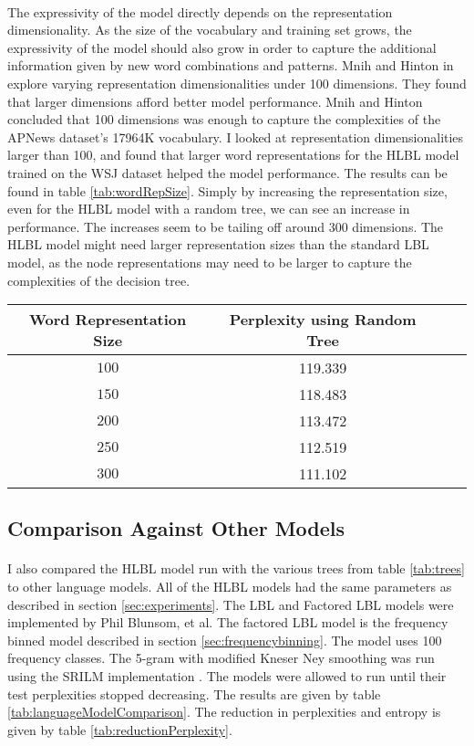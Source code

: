 \paragraph{}
The expressivity of the model directly depends on the representation dimensionality. As the size of the vocabulary and training set grows, the expressivity of the model should also grow in order to capture the additional information given by new word combinations and patterns. Mnih and Hinton in \cite{MnihHinton2009} explore varying representation dimensionalities under 100 dimensions. They found that larger dimensions afford better model performance. Mnih and Hinton concluded that 100 dimensions was enough to capture the complexities of the APNews dataset's 17964K vocabulary. I looked at representation dimensionalities larger than 100, and found that larger word representations for the HLBL model trained on the WSJ dataset helped the model performance. The results can be found in table \ref{tab:wordRepSize}. Simply by increasing the representation size, even for the HLBL model with a random tree, we can see an increase in performance. The increases seem to be tailing off around 300 dimensions.  The HLBL model might need larger representation sizes than the standard LBL model, as the node representations may need to be larger to capture the complexities of the decision tree.


\begin{table*} \centering
{}
\begin{tabular}{@{}cccc@{}}\toprule
Word Representation Size & Perplexity using Random Tree\\ 
\midrule
$100$ & 119.339 \\
$150$ & 118.483 \\
$200$ & 113.472 \\
$250$ & 112.519 \\
$300$ & 111.102 \\
\bottomrule
\end{tabular}
\caption{The effect of word representation size on test perplexity.}
\label{tab:wordRepSize}
\end{table*}

\subsection{Comparison Against Other Models}
\paragraph{}
I also compared the HLBL model run with the various trees from table \ref{tab:trees} to other language models. All of the HLBL models had the same parameters as described in section \ref{sec:experiments}. The LBL and Factored LBL models were implemented by Phil Blunsom, et al. The factored LBL model is the frequency binned model described in section \ref{sec:frequencybinning}. The model uses 100 frequency classes. The 5-gram with modified Kneser Ney smoothing was run using the SRILM implementation \cite{Alumae2010}. The models were allowed to run until their test perplexities stopped decreasing. The results are given by table \ref{tab:languageModelComparison}. The reduction in perplexities and entropy is given by table \ref{tab:reductionPerplexity}. 

